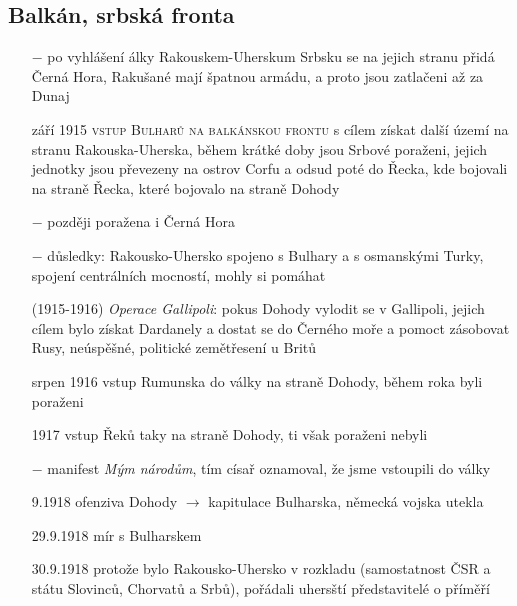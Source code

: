 \documentclass{article}
\begin{document}
\subsection*{Balkán, srbská fronta}
\begin{itemize}
    \vspace{-0.5em}
    \setlength\itemsep{0.15em}
    \item[$-$] po vyhlášení álky Rakouskem-Uherskum Srbsku se na jejich stranu přidá Černá Hora, Rakušané mají špatnou armádu, a proto jsou zatlačeni až za Dunaj
    \item[září 1915] \textsc{vstup Bulharů na balkánskou frontu} s cílem získat další území na stranu Rakouska-Uherska, během krátké doby jsou Srbové poraženi, jejich jednotky jsou převezeny na ostrov Corfu a odsud poté do Řecka, kde bojovali na straně Řecka, které bojovalo na straně Dohody
    \item[$-$] později poražena i Černá Hora
    \item[$-$] důsledky: Rakousko-Uhersko  spojeno s Bulhary a s osmanskými Turky, spojení centrálních mocností, mohly si pomáhat
    \item[(1915-1916)] \textit{Operace Gallipoli}: pokus Dohody vylodit se v Gallipoli, jejich cílem bylo získat Dardanely a dostat se do Černého moře a pomoct zásobovat Rusy, neúspěšné, politické zemětřesení u Britů
    \item[srpen 1916] vstup Rumunska do války na straně Dohody, během roka byli poraženi
    \item[1917] vstup Řeků taky na straně Dohody, ti však poraženi nebyli
    \item[$-$] manifest \textit{Mým národům}, tím císař oznamoval, že jsme vstoupili do války
    \item[9.1918]  ofenziva Dohody $\rightarrow$ kapitulace Bulharska, německá vojska utekla
    \item[29.9.1918]  mír s Bulharskem
    \item[30.9.1918] protože bylo Rakousko-Uhersko v rozkladu (samostatnost ČSR a státu Slovinců, Chorvatů a Srbů), pořádali uhersští představitelé o příměří
\end{itemize}
\end{document}
